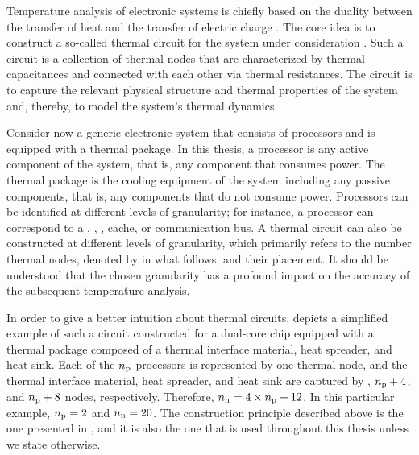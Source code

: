Temperature analysis of electronic systems is chiefly based on the duality
between the transfer of heat and the transfer of electric charge
\cite{kreith2000}. The core idea is to construct a so-called thermal 
circuit for the system under consideration \cite{skadron2003}. Such a circuit is
a collection of thermal nodes that are characterized by thermal capacitances and
connected with each other via thermal resistances. The circuit is to capture the
relevant physical structure and thermal properties of the system and, thereby,
to model the system's thermal dynamics.

Consider now a generic electronic system that consists of \np processors and is
equipped with a thermal package. In this thesis, a processor is any active
component of the system, that is, any component that consumes power. The thermal
package is the cooling equipment of the system including any passive components,
that is, any components that do not consume power. Processors can be identified
at different levels of granularity; for instance, a processor can correspond to
a , , , cache, or communication bus. A thermal 
circuit can also be constructed at different levels of granularity, which
primarily refers to the number thermal nodes, denoted by \nn in what follows,
and their placement. It should be understood that the chosen granularity has a
profound impact on the accuracy of the subsequent temperature analysis.

In order to give a better intuition about thermal  circuits,
 depicts a simplified example of such a circuit
constructed for a dual-core chip equipped with a thermal package composed of a
thermal interface material, heat spreader, and heat sink. Each of the ${n_\mathrm{p}}$
processors is represented by one thermal node, and the thermal interface
material, heat spreader, and heat sink are captured by \np, ${n_\mathrm{p}} + 4$, and ${n_\mathrm{p}}
+ 8$ nodes, respectively. Therefore, ${n_\mathrm{n}} = 4 \times {n_\mathrm{p}} + 12$. In this
particular example, ${n_\mathrm{p}} = 2$ and ${n_\mathrm{n}} = 20$. The construction principle
described above is the one presented in \cite{huang2008}, and it is also the one
that is used throughout this thesis unless we state otherwise.

